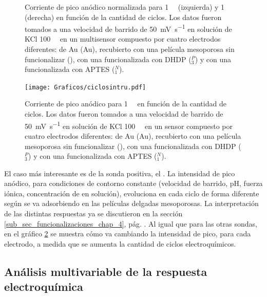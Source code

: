 \begin{figure}[t!]
\begin{subfigure}[t]{0.495\textwidth}
			\end{subfigure}
		      	\caption[Corriente de pico de \fc\space y \fe\space en función del número de ciclos]{Corriente de pico anódico normalizada para \fc\space \SI{1}{\milli\Molar} (izquierda) y  \fe\space \SI{1}{\milli\Molar} (derecha) en función de la cantidad de ciclos. Los datos fueron tomados a una velocidad de barrido de \SI{50}{\milli\volt\per\second} en solución de KCl \SI{100}{\milli\Molar} en un multisensor compuesto por cuatro electrodos diferentes: de Au (Au), recubierto con una película mesoporosa sin funcionalizar (\pdmZ), con una funcionalizada con DHDP (\pdmZ$^P_3$) y con una funcionalizada con APTES (\pdmZ$^N_1$).}
		      	\label{fig:ciclos-fe-fcoh}
		      	\end{figure}

		     \begin{figure}[b!]
		 	       	\begin{center}
		 	       	\texttt{[image: Graficos/ciclosintru.pdf]}
		        	\caption[Corriente de pico de \ru\space en función del número de ciclos]{Corriente de pico anódico para \ru\space \SI{1}{\milli\Molar} en función de la cantidad de ciclos. Los datos fueron tomados a una velocidad de barrido de \SI{50}{\milli\volt\per\second} en solución de KCl \SI{100}{\milli\Molar} en un sensor compuesto por cuatro electrodos diferentes: de Au (Au), recubierto con una película mesoporosa sin funcionalizar (\pdmZ), con una funcionalizada con DHDP (\pdmZ$^P_3$) y con una funcionalizada con APTES (\pdmZ$^N_1$).}
		         	\label{fig:ruciclos}
		         	\end{center}
		     		\end{figure}

	    El caso más interesante es de la sonda positiva, el \ru. La intensidad de pico anódico, para condiciones de contorno constante (velocidad de barrido, pH, fuerza iónica, concentración de \ru\space en solución), evoluciona en cada ciclo de forma diferente según se va adsorbiendo en las películas delgadas mesoporosas. La interpretación de las distintas respuestas ya se discutieron en la sección \ref{sub_sec_funcionalizaciones_chap_4}, pág. \pageref{sub_sec_funcionalizaciones_chap_4}. Al igual que para las otras sondas, en el gráfico \ref{fig:ruciclos}  se muestra cómo va cambiando la intensidad de pico, para cada electrodo, a medida que se aumenta la cantidad de ciclos electroquímicos. 

	\subsection{Análisis multivariable de la respuesta electroquímica}	     		

